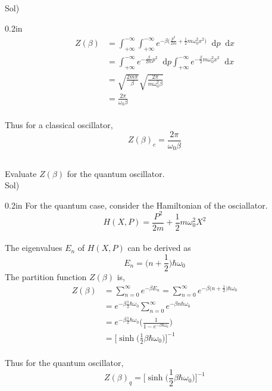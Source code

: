 \documentclass[paper=a4, fontsize=11pt]{scrartcl}
\numberwithin{equation}{section}
\numberwithin{figure}{section}
\numberwithin{table}{section}
\newcommand*\dif{\mathop{}\!\mathrm{d}}
\newenvironment{problem}{\subsection{}}{}
\newenvironment{solution}{Sol) \begin{adjustwidth}{0.2in}{}\vspace{0.1in}}{\end{adjustwidth}}
\begin{document}
\begin{solution}
	\begin{equation}
		\begin{split}
		 Z(\beta) &= \int_{+\infty}^{-\infty}\int_{+\infty}^{-\infty} e^{-\beta\big(\frac{p^2}{2m}+\frac{1}{2}m\omega_{0}^2 x^2 \big)}  \dif p \dif x \\
		 &= \int_{+\infty}^{-\infty} e^{-\frac{\beta }{2m}p^2}  \dif p \int_{+\infty}^{-\infty} e^{-\frac{\beta}{2}m\omega_{0}^2 x^2}  \dif x \\
		 &= \sqrt{\frac{2m \pi}{\beta}}\sqrt{\frac{2\pi}{m\omega_{0}^2 \beta}} \\
		 &= \frac{2\pi}{\omega_{0}\beta}
		\end{split}
	\end{equation}\\
	Thus for a classical oscillator,\\
	\begin{equation}
		Z(\beta)_{c}= \frac{2\pi}{\omega_{0}\beta}
	\end{equation}
\end{solution}

\vskip 0.3in

\begin{problem}
	Evaluate $Z(\beta)$ for the quantum oscillator.
\end{problem} \\

\begin{solution}
	For the quantum case, consider the Hamiltonian of the osciallator.\\
	\begin{equation}
		H(X,P) = \frac{P^2}{2m} + \frac{1}{2}m\omega_{0}^2 X^2
	\end{equation}\\
	The eigenvalues $E_n$ of $H(X,P)$ can be derived as \\
	\begin{equation}
		E_n = \Big(n+\frac{1}{2}\Big)\hbar\omega_{0}
	\end{equation}
	The partition function $Z(\beta)$ is,
	\begin{equation}
		\begin{split}
		Z(\beta) &= \sum_{n=0}^{\infty} e^{-\beta E_n} = \sum_{n=0}^{\infty} e^{-\beta \big(n+\frac{1}{2}\big)\hbar\omega_{0}}\\
		&= e^{-\beta\frac{1}{2}\hbar\omega_{0}}\sum_{n=0}^{\infty} e^{-\beta n \hbar \omega_{0}} \\
		&= e^{-\beta\frac{1}{2}\hbar\omega_{0}} \bigg(\frac{1}{1-e^{-\beta \hbar \omega_{0}}}\bigg) \\
		&= \bigg[\sinh\bigg(\frac{1}{2}\beta\hbar\omega_{0}\bigg)\bigg]^{-1}
		\end{split}
	\end{equation}\\
	Thus for the quantum oscillator, \\
	\begin{equation}
		Z(\beta)_{q} = \bigg[\sinh\bigg(\frac{1}{2}\beta\hbar\omega_{0}\bigg)\bigg]^{-1} 
	\end{equation}
\end{solution}
\end{document}
